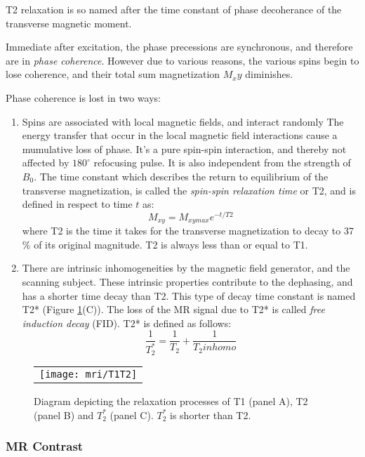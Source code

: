 T2 relaxation is so named after the time constant of phase decoherance of the transverse magnetic moment. 

Immediate after excitation, the phase precessions are synchronous, and therefore are in \textit{phase coherence}.  
However due to various reasons, the various spins begin to lose coherence, and their total sum magnetization $M_xy$ diminishes. 

Phase coherence is lost in two ways:
\begin{enumerate}
\item Spins are associated with local magnetic fields, and interact randomly The energy transfer that occur in the local magnetic field interactions cause a mumulative loss of phase. It's a pure spin-spin interaction, and thereby not affected by $180^\circ$ refocusing pulse. It is also independent from the strength of $B_0$. 
The time constant which describes the return to equilibrium of the transverse magnetization, is called the \textit{spin-spin
relaxation time} or T2, and is defined in respect to time $t$ as:
$$M_{xy} =M_{xymax} e^{-t/T2}$$
where T2 is the time it takes for the transverse magnetization to decay to 37$\%$ of its original magnitude. 
T2 is always less than or equal to T1.

\item There are intrinsic inhomogeneities by the magnetic field generator, and the scanning subject. These intrinsic properties contribute to the dephasing, and has a shorter time decay than T2. This type of decay time constant is named T2*  (Figure \ref{fig:T1T2}(C)). The loss of the MR signal due to T2* is called\textit{ free induction decay} (FID). T2* is defined as follows: 
$$ \frac{1}{T_2^*} = \frac{1}{T_2} + \frac{1}{T_2inhomo}$$ 
\end{enumerate}

\begin{figure}[h]
\begin{center}
\begin{tabular}{c}
\texttt{[image: mri/T1T2]}
\end{tabular}
\caption{Diagram depicting the relaxation processes of T1 (panel A), T2 (panel B) and $T_2^*$ (panel C). $T_2^*$ is shorter than T2.} \label{fig:T1T2}
\end{center}
\end{figure}

\subsubsection{MR Contrast}

